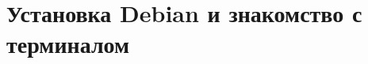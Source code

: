 \chapter{Установка Debian и знакомство с терминалом}
\label{supplementary:debian-install}
\begingroup
\setlength{\emergencystretch}{2em}
\providecommand{\tightlist}{\setlength{\itemsep}{0pt}\setlength{\parskip}{0pt}}

\endgroup

